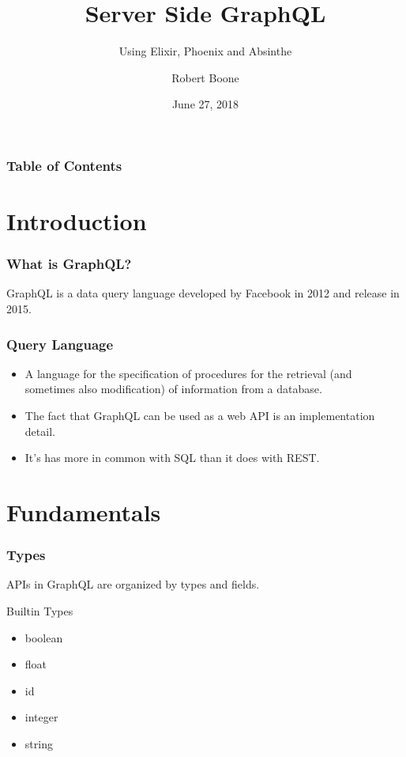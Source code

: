 \documentclass{beamer}
\title{Server Side GraphQL}
\subtitle{Using Elixir, Phoenix and Absinthe}
\author[rlb3]{Robert Boone}
\institute[C1]{ChaiOne}
\date{June 27, 2018}
\begin{document}
 
\frame{\titlepage}

\begin{frame}
\frametitle{Table of Contents}
\tableofcontents
\end{frame}

\section{Introduction}

\begin{frame}
\frametitle{What is GraphQL?}
GraphQL is a data \alert{query language} developed by Facebook in 2012 and release in 2015.
\end{frame}

\begin{frame}
  \frametitle{Query Language}

  \begin{itemize}
    \item{A language for the specification of procedures for the retrieval (and sometimes also modification) of information from a database.} \pause

    \item{The fact that GraphQL can be used as a web API is an implementation detail.}

  \pause

  \item{It's has more in common with SQL than it does with REST.}
  \end{itemize}

\end{frame}

\section{Fundamentals}

\begin{frame}
  \frametitle{Types}

  APIs in GraphQL are organized by types and fields.
  \begin{block}{Builtin Types}
    \begin{itemize}
    \item{boolean}
    \item{float}
    \item{id}
    \item{integer}
    \item{string}
    \end{itemize}
  \end{block}
\end{frame}
\end{document}
